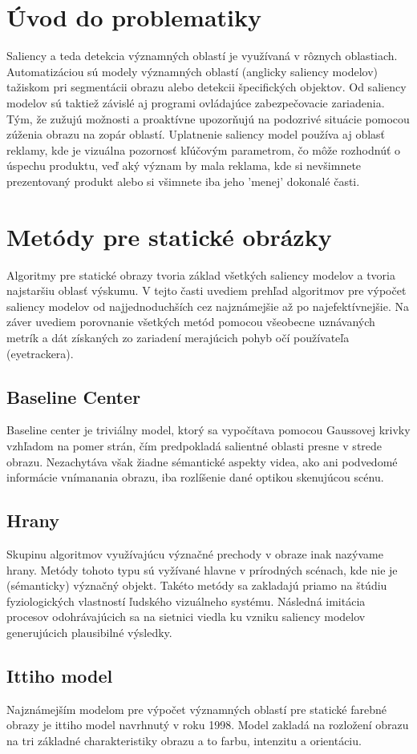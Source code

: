 \section{Úvod do problematiky}
Saliency a teda detekcia významných oblastí je využívaná v rôznych oblastiach.
Automatizáciou sú modely významných oblastí (anglicky saliency modelov) tažiskom pri segmentácii obrazu alebo detekcii špecifických objektov.
Od saliency modelov sú taktiež závislé aj programi ovládajúce zabezpečovacie zariadenia.
Tým, že zužujú možnosti a proaktívne upozorňujú na podozrivé situácie pomocou zúženia obrazu na zopár oblastí.
Uplatnenie saliency model používa aj oblasť reklamy, kde je vizuálna pozornosť kľúčovým parametrom, čo môže rozhodnúť o úspechu produktu, veď aký význam by mala reklama, kde si nevšimnete prezentovaný produkt alebo si všimnete iba jeho 'menej' dokonalé časti.
\section{Metódy pre statické obrázky}
Algoritmy pre statické obrazy tvoria základ všetkých saliency modelov a tvoria najstaršiu oblasť výskumu.
V tejto časti uvediem prehľad algoritmov pre výpočet saliency modelov od najjednoduchších cez najznámejšie až po najefektívnejšie.
Na záver uvediem porovnanie všetkých metód pomocou všeobecne uznávaných metrík a dát získaných zo zariadení merajúcich pohyb očí používateľa (eyetrackera).
\subsection{Baseline Center}\label{section:caseline-center}
Baseline center je triviálny model,  ktorý sa vypočítava pomocou Gaussovej krivky vzhľadom na pomer strán, čím predpokladá salientné oblasti presne v strede obrazu.
Nezachytáva však žiadne sémantické aspekty videa, ako ani podvedomé informácie vnímanania obrazu, iba rozlíšenie dané optikou skenujúcou scénu.
\subsection{Hrany}
Skupinu algoritmov využívajúcu význačné prechody v obraze inak nazývame hrany.
Metódy tohoto typu sú vyžívané hlavne v prírodných scénach, kde nie je (sémanticky) význačný objekt.
Takéto metódy sa zakladajú priamo na štúdiu fyziologických vlastností ľudského vizuálneho systému.
Následná imitácia procesov odohrávajúcich sa na sietnici viedla ku vzniku saliency modelov generujúcich plausibilné výsledky\cite{edges-1}.
\subsection{Ittiho model}
Najznámejším modelom pre výpočet významných oblastí pre statické farebné obrazy je ittiho model navrhnutý v roku 1998.
Model zakladá na rozložení obrazu na tri základné charakteristiky obrazu a to farbu, intenzitu a orientáciu.

